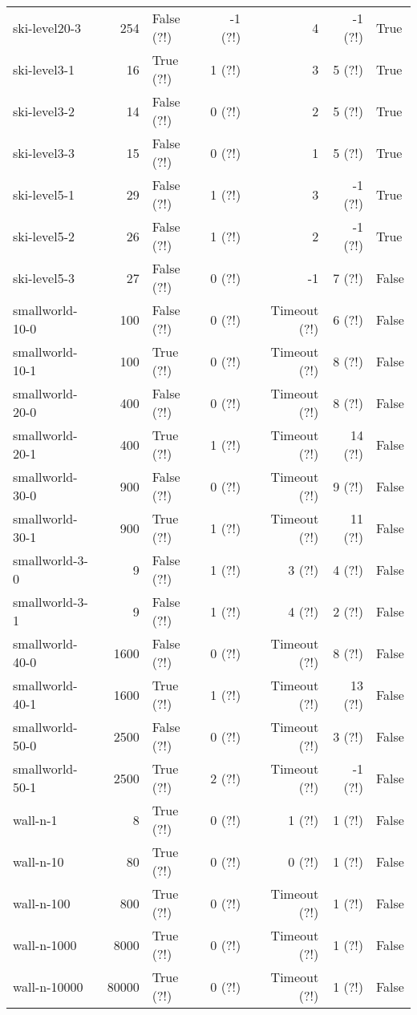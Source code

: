 \begin{longtable}{lrlrrrl}
ski-level20-3 & 254 & False (?!) & -1 (?!) & 4 & -1 (?!) & True \\
ski-level3-1 & 16 & True (?!) & 1 (?!) & 3 & 5 (?!) & True \\
ski-level3-2 & 14 & False (?!) & 0 (?!) & 2 & 5 (?!) & True \\
ski-level3-3 & 15 & False (?!) & 0 (?!) & 1 & 5 (?!) & True \\
ski-level5-1 & 29 & False (?!) & 1 (?!) & 3 & -1 (?!) & True \\
ski-level5-2 & 26 & False (?!) & 1 (?!) & 2 & -1 (?!) & True \\
ski-level5-3 & 27 & False (?!) & 0 (?!) & -1 & 7 (?!) & False \\
smallworld-10-0 & 100 & False (?!) & 0 (?!) & Timeout (?!) & 6 (?!) & False \\
smallworld-10-1 & 100 & True (?!) & 0 (?!) & Timeout (?!) & 8 (?!) & False \\
smallworld-20-0 & 400 & False (?!) & 0 (?!) & Timeout (?!) & 8 (?!) & False \\
smallworld-20-1 & 400 & True (?!) & 1 (?!) & Timeout (?!) & 14 (?!) & False \\
smallworld-30-0 & 900 & False (?!) & 0 (?!) & Timeout (?!) & 9 (?!) & False \\
smallworld-30-1 & 900 & True (?!) & 1 (?!) & Timeout (?!) & 11 (?!) & False \\
smallworld-3-0 & 9 & False (?!) & 1 (?!) & 3 (?!) & 4 (?!) & False \\
smallworld-3-1 & 9 & False (?!) & 1 (?!) & 4 (?!) & 2 (?!) & False \\
smallworld-40-0 & 1600 & False (?!) & 0 (?!) & Timeout (?!) & 8 (?!) & False \\
smallworld-40-1 & 1600 & True (?!) & 1 (?!) & Timeout (?!) & 13 (?!) & False \\
smallworld-50-0 & 2500 & False (?!) & 0 (?!) & Timeout (?!) & 3 (?!) & False \\
smallworld-50-1 & 2500 & True (?!) & 2 (?!) & Timeout (?!) & -1 (?!) & False \\
wall-n-1 & 8 & True (?!) & 0 (?!) & 1 (?!) & 1 (?!) & False \\
wall-n-10 & 80 & True (?!) & 0 (?!) & 0 (?!) & 1 (?!) & False \\
wall-n-100 & 800 & True (?!) & 0 (?!) & Timeout (?!) & 1 (?!) & False \\
wall-n-1000 & 8000 & True (?!) & 0 (?!) & Timeout (?!) & 1 (?!) & False \\
wall-n-10000 & 80000 & True (?!) & 0 (?!) & Timeout (?!) & 1 (?!) & False \\

\end{longtable}
